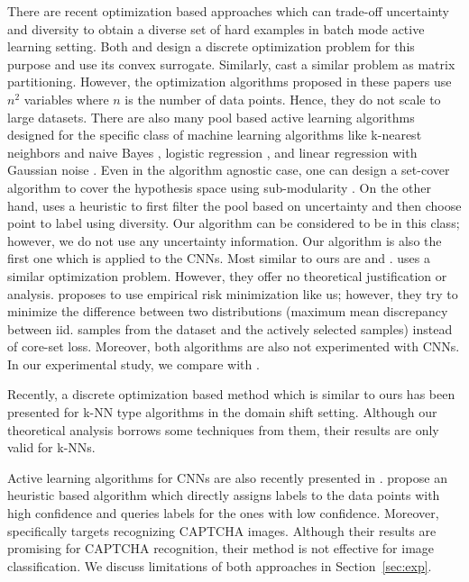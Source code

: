 \documentclass{article} \usepackage{iclr2018_conference,times}
\begin{document}
There are recent optimization based approaches which can trade-off uncertainty
and diversity to obtain a diverse set of hard examples in batch mode active learning setting. Both
\citet{elhamifar2013convex} and \citet{yang2015multi} design a discrete optimization problem for this
purpose and use its convex surrogate. Similarly, \citet{guo2010} cast a similar problem as matrix partitioning. However, the optimization algorithms proposed in these papers use $n^2$
variables where $n$ is the number of data points. Hence, they do not scale to
large datasets. There are also many pool based active
learning algorithms designed for the specific class of machine learning
algorithms like k-nearest neighbors and naive Bayes \citep{wei2015submodularity}, logistic regression \cite{hoi_et_al, guo_et_al}, and linear regression with Gaussian noise \citep{yu2006active}.
Even in the algorithm agnostic case, one can design a set-cover algorithm to
cover the hypothesis space using sub-modularity \citep{guillory2010interactive,
golovin2011adaptive}. On the other hand, \citet{demir2011batch} uses a heuristic to first filter the pool based on uncertainty and then choose point to label using diversity. Our algorithm can be considered to be in this class;
however, we do not use any uncertainty information. Our algorithm is also the
first one which is applied to the CNNs. Most similar to ours are \citep{porikli} and \citep{kdd13}. \citet{porikli}
uses a similar optimization problem. However, they offer no theoretical
justification or analysis. \citet{kdd13} proposes to use empirical risk minimization like us; however, they try to minimize the difference between two distributions (maximum mean discrepancy between iid. samples from the dataset and the actively selected samples) instead of core-set loss. Moreover, both algorithms are also not experimented with CNNs. In our experimental study, we compare with \citep{kdd13}.

Recently, a discrete optimization based method \citep{BerlindU15} which is
similar to ours has been presented for k-NN type algorithms in the domain shift
setting. Although our theoretical analysis borrows some techniques from them, their results are only valid for k-NNs.

Active learning algorithms for CNNs are also recently presented in
\citep{wang2016cost, captcha}. \citet{wang2016cost} propose an heuristic based algorithm which directly assigns
labels to the data points with high confidence and queries labels for the ones
with low confidence. Moreover, \citet{captcha} specifically targets recognizing CAPTCHA images. Although their results are promising for CAPTCHA recognition, their method is not effective for image classification. We discuss limitations of both approaches in Section~\ref{sec:exp}.
\end{document}

